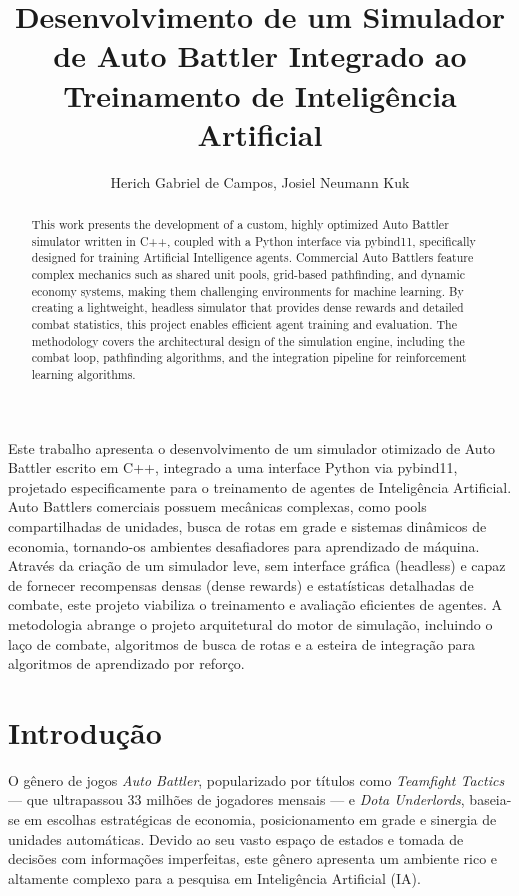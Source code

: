 \documentclass[12pt]{article}
\title{Desenvolvimento de um Simulador de Auto Battler Integrado ao Treinamento de Inteligência Artificial}
\author{Herich Gabriel de Campos\inst{1}, Josiel Neumann Kuk\inst{1}}
\begin{document}
\maketitle

\begin{abstract}
  This work presents the development of a custom, highly optimized Auto Battler simulator written in C++, coupled with a Python interface via pybind11, specifically designed for training Artificial Intelligence agents. Commercial Auto Battlers feature complex mechanics such as shared unit pools, grid-based pathfinding, and dynamic economy systems, making them challenging environments for machine learning. By creating a lightweight, headless simulator that provides dense rewards and detailed combat statistics, this project enables efficient agent training and evaluation. The methodology covers the architectural design of the simulation engine, including the combat loop, pathfinding algorithms, and the integration pipeline for reinforcement learning algorithms.
\end{abstract}

\begin{resumo}
  Este trabalho apresenta o desenvolvimento de um simulador otimizado de Auto Battler escrito em C++, integrado a uma interface Python via pybind11, projetado especificamente para o treinamento de agentes de Inteligência Artificial. Auto Battlers comerciais possuem mecânicas complexas, como pools compartilhadas de unidades, busca de rotas em grade e sistemas dinâmicos de economia, tornando-os ambientes desafiadores para aprendizado de máquina. Através da criação de um simulador leve, sem interface gráfica (headless) e capaz de fornecer recompensas densas (dense rewards) e estatísticas detalhadas de combate, este projeto viabiliza o treinamento e avaliação eficientes de agentes. A metodologia abrange o projeto arquitetural do motor de simulação, incluindo o laço de combate, algoritmos de busca de rotas e a esteira de integração para algoritmos de aprendizado por reforço.
\end{resumo}

\section{Introdução} \label{sec:introducao}

O gênero de jogos \textit{Auto Battler}, popularizado por títulos como \textit{Teamfight Tactics} — que ultrapassou 33 milhões de jogadores mensais \cite{henkel2019} — e \textit{Dota Underlords}, baseia-se em escolhas estratégicas de economia, posicionamento em grade e sinergia de unidades automáticas. Devido ao seu vasto espaço de estados e tomada de decisões com informações imperfeitas, este gênero apresenta um ambiente rico e altamente complexo para a pesquisa em Inteligência Artificial (IA).
\end{document}
